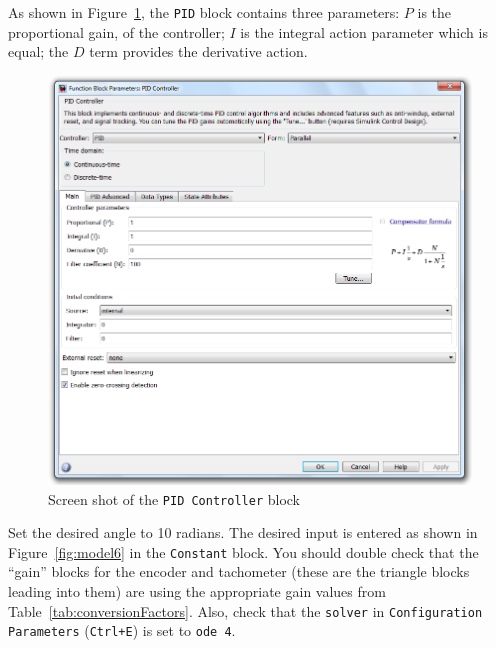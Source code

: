 As shown in Figure~\ref{fig:PIDparameters}, the \verb|PID| block contains three parameters: \(P\) is the proportional gain, of the controller; \(I\) is the integral action parameter which is equal; the \(D\) term provides the derivative action.
\begin{figure}[H]
    \centering
    \includegraphics[width=0.6\hsize]{pix/PID.PNG}
    \caption{Screen shot of the \texttt{PID Controller} block}\label{fig:PIDparameters}
\end{figure}
Set the desired angle to 10 radians.  The desired input is entered as
shown in Figure~\ref{fig:model6} in the \verb|Constant| block. You should double check that the ``gain'' blocks for the encoder and tachometer (these are the triangle blocks leading into them) are
using the appropriate gain values from Table~\ref{tab:conversionFactors}. Also, check that the \verb|solver| in \verb|Configuration Parameters|
(\verb|Ctrl+E|) is set to \verb|ode 4|.

